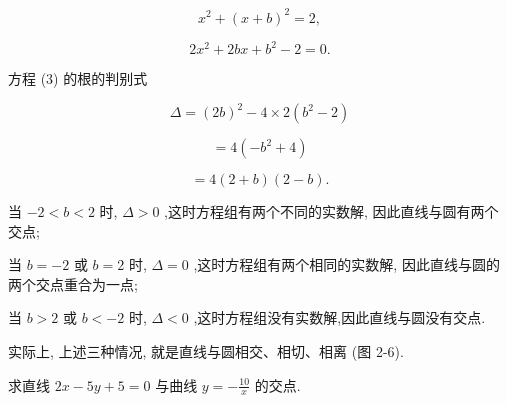 \documentclass[lang=cn,newtx,10pt,scheme=chinese]{elegantbook}
\begin{document}
\[
    {x}^{2} + {\left( x + b\right) }^{2} = 2,
\]

\[
  2{x}^{2} + {2bx} + {b}^{2} - 2 = 0. \tag{3}
\]

方程 (3) 的根的判别式

\[
  \Delta = {\left( 2b\right) }^{2} - 4 \times 2\left( {{b}^{2} - 2}\right)
\]

\[
  = 4\left( {-{b}^{2} + 4}\right)
\]

\[
  = 4\left( {2 + b}\right) \left( {2 - b}\right) \text{.}
\]

当 \(- 2 < b < 2\) 时, \(\Delta > 0\) ,这时方程组有两个不同的实数解, 因此直线与圆有两个交点;

当 \(b = - 2\) 或 \(b = 2\) 时, \(\Delta = 0\) ,这时方程组有两个相同的实数解, 因此直线与圆的两个交点重合为一点;

当 \(b > 2\) 或 \(b < - 2\) 时, \(\Delta < 0\) ,这时方程组没有实数解,因此直线与圆没有交点.

实际上, 上述三种情况, 就是直线与圆相交、相切、相离 (图 2-6).

\begin{problemset}[练习]

\item 求直线 \({2x} - {5y} + 5 = 0\) 与曲线 \(y = - \frac{10}{x}\) 的交点.
\end{problemset}
\end{document}
